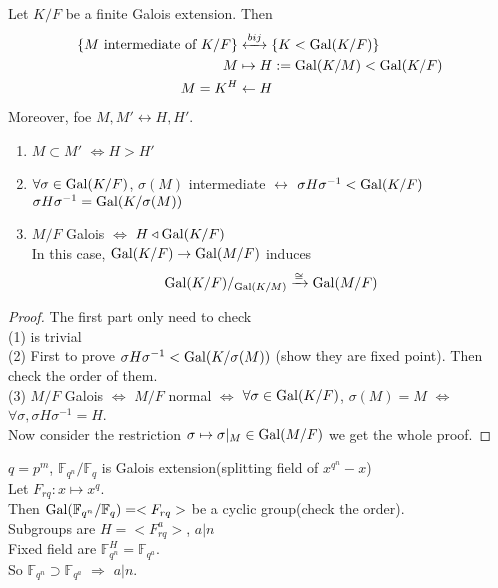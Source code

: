 \begin{theorem}
    Let  $ K/F  $ be a finite Galois extension. Then 
    \begin{align}
        \{M \text{ intermediate of }K/F\}&\xleftrightarrow{bij} \{K<\operatorname{Gal}(K/F)\}\\
        M&\mapsto H:=\operatorname{Gal}(K/M)<\operatorname{Gal}(K/F)\\
        M=K^H&\leftarrow H   
    \end{align}
    Moreover, foe  $ M,M'\leftrightarrow H,H' $.
    \begin{enumerate}[(1)]
        \item  $ M\subset M'  $  $ \Leftrightarrow H>H' $
        \item  $ \forall \sigma\in \operatorname{Gal}(K/F) $,  $ \sigma(M) $ intermediate  $ \leftrightarrow  $  $ \sigma H\sigma^{-1}<\operatorname{Gal}(K/F) $ \ie  $ \sigma H \sigma^{-1}=\operatorname{Gal}(K/\sigma(M)) $ 
        \item  $ M/F  $ Galois  $ \Leftrightarrow  $  $ H\triangleleft \operatorname{Gal}(K/F) $\\
        In this case,  $ \operatorname{Gal}(K/F )\rightarrow \operatorname{Gal}(M/F) $ induces 
        \[\operatorname{Gal}(K/F)/_{\operatorname{Gal}(K/M)}\xrightarrow{\cong}\operatorname{Gal}(M/F)\]  
    \end{enumerate} 
\end{theorem}
\begin{proof}
    The first part only need to check\\
    (1) is trivial\\
    (2) First to prove  $ \sigma H\sigma^{-1}<\operatorname{Gal}(K/\sigma(M)) $ (show they are fixed point). Then check the order of them. \\
    (3)  $ M/F  $ Galois  $ \Leftrightarrow  $  $ M/F  $ normal  $ \Leftrightarrow  $  $ \forall \sigma\in \operatorname{Gal}(K/F ) $,  $ \sigma(M)=M $  $ \Leftrightarrow $  $ \forall \sigma,  \sigma H\sigma^{-1}=H  $.\\
    Now consider the restriction  $ \sigma\mapsto \sigma|_M\in \operatorname{Gal}(M/F) $ we get the whole proof. 
\end{proof}
\begin{example}
     $ q=p^m $,  $ \mathbb{F}_{q^n}/\mathbb{F}_q $ is Galois extension(splitting field of  $ x^{q^n}-x $)\\
     Let  $ F_{rq}:x\mapsto x^q $.\\
     Then  $ \operatorname{Gal}(\mathbb{F}_{q^n}/\mathbb{F}_q)=<F_{rq}> $ be a cyclic group(check the order).\\
     Subgroups are  $ H=<F^a_{rq}> $,  $ a|n $ \\
     Fixed field are  $ \mathbb{F}_{q^n}^H=\mathbb{F}_{q^a} $.\\
     So  $ \mathbb{F}_{q^n}\supset \mathbb{F}_{q^a} $ $ \Rightarrow  $  $ a|n $.       
\end{example}
